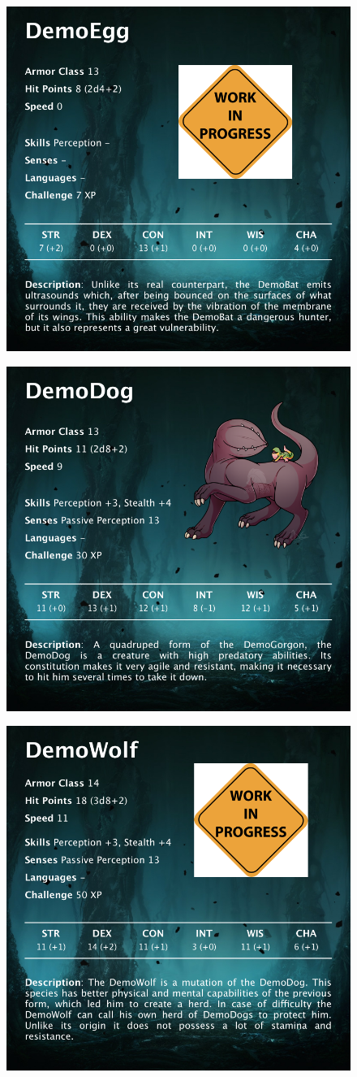 \begin{figure}[H]
	\centering
	\includegraphics[width=0.7\linewidth]{images/visual_stats/demoegg.png}
\end{figure}


\begin{figure}[H]
	\centering
	\includegraphics[width=0.7\linewidth]{images/visual_stats/demodog.png}
\end{figure}


\begin{figure}[H]
	\centering
	\includegraphics[width=0.7\linewidth]{images/visual_stats/demowolf.png}
\end{figure}


